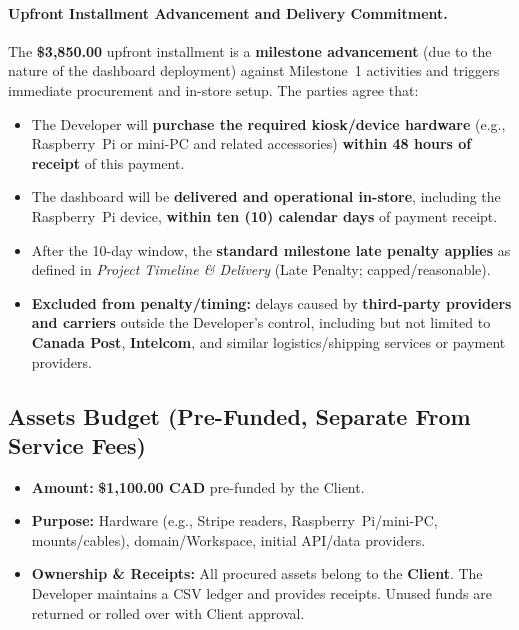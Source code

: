 \documentclass[11pt, a4paper]{article}
\begin{document}
\paragraph{Upfront Installment Advancement and Delivery Commitment.}
The \textbf{\$3{,}850.00} upfront installment is a \textbf{milestone advancement} (due to the nature of the dashboard deployment) against Milestone~1 activities and triggers immediate procurement and in-store setup. The parties agree that:
\begin{itemize}[leftmargin=*]
  \item The Developer will \textbf{purchase the required kiosk/device hardware} (e.g., Raspberry~Pi or mini-PC and related accessories) \textbf{within 48 hours of receipt} of this payment.
  \item The dashboard will be \textbf{delivered and operational in-store}, including the Raspberry~Pi device, \textbf{within ten (10) calendar days} of payment receipt.
  \item After the 10-day window, the \textbf{standard milestone late penalty applies} as defined in \textit{Project Timeline \& Delivery} (Late Penalty; capped/reasonable).
  \item \textbf{Excluded from penalty/timing:} delays caused by \textbf{third-party providers and carriers} outside the Developer’s control, including but not limited to \textbf{Canada Post}, \textbf{Intelcom}, and similar logistics/shipping services or payment providers.
\end{itemize}

\subsection{Assets Budget (Pre-Funded, Separate From Service Fees)}
\label{sec:assets}
\begin{itemize}
  \item \textbf{Amount:} \textbf{\$1{,}100.00 CAD} pre-funded by the Client.
  \item \textbf{Purpose:} Hardware (e.g., Stripe readers, Raspberry~Pi/mini-PC, mounts/cables), domain/Workspace, initial API/data providers.
  \item \textbf{Ownership \& Receipts:} All procured assets belong to the \textbf{Client}. The Developer maintains a CSV ledger and provides receipts. Unused funds are returned or rolled over with Client approval.
\end{itemize}

\end{document}
